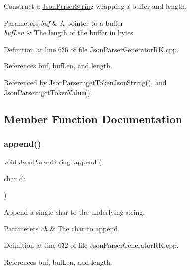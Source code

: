 Construct a \hyperlink{class_json_parser_string}{Json\+Parser\+String} wrapping a buffer and length. 


\begin{DoxyParams}{Parameters}
{\em buf} & A pointer to a buffer\\
\hline
{\em buf\+Len} & The length of the buffer in bytes \\
\hline
\end{DoxyParams}


Definition at line 626 of file Json\+Parser\+Generator\+R\+K.\+cpp.



References buf, buf\+Len, and length.



Referenced by Json\+Parser\+::get\+Token\+Json\+String(), and Json\+Parser\+::get\+Token\+Value().



\subsection{Member Function Documentation}
\mbox{\label{class_json_parser_string_a7a8f809096c291c4cd7717df4a6534cf}} 
\subsubsection{\texorpdfstring{append()}{append()}\hspace{0.1cm}{\footnotesize\ttfamily [1/2]}}
{\footnotesize\ttfamily void Json\+Parser\+String\+::append (\begin{DoxyParamCaption}\item[{char}]{ch }\end{DoxyParamCaption})}



Append a single char to the underlying string. 


\begin{DoxyParams}{Parameters}
{\em ch} & The char to append. \\
\hline
\end{DoxyParams}


Definition at line 632 of file Json\+Parser\+Generator\+R\+K.\+cpp.



References buf, buf\+Len, and length.



